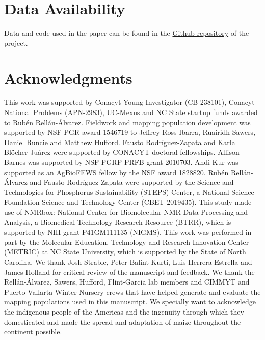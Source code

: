 \documentclass[9pt,twocolumn,twoside,lineno]{biorxiv}
\newcommand{\beginsupplement}{%
        \setcounter{table}{0}
        \renewcommand{\thetable}{S\arabic{table}}%
        \setcounter{figure}{0}
        \renewcommand{\thefigure}{S\arabic{figure}}%
     }
\begin{document}
\section{Data Availability}
Data and code used in the paper can be found in the \href{https://github.com/sawers-rellan-labs/High-PC1-paper}{Github repository} of the project. 



\section{Acknowledgments}
This work was supported by Conacyt Young Investigator (CB-238101), Conacyt National Problems (APN-2983), UC-Mexus and NC State startup funds awarded to Rub\'en Rellán-Álvarez. 
Fieldwork and mapping population development was supported by NSF-PGR award 1546719 to Jeffrey Ross-Ibarra, Ruairidh Sawers, Daniel Runcie and Matthew Hufford.  
Fausto Rodríguez-Zapata and Karla Blöcher-Juárez were supported by CONACYT doctoral fellowships.
Allison Barnes was supported by NSF-PGRP PRFB grant 2010703. 
Andi Kur was supported as an AgBioFEWS fellow by the NSF award 1828820.
Rubén Rellán-Álvarez and Fausto Rodríguez-Zapata were supported by the Science and Technologies for Phosphorus Sustainability (STEPS) Center, a National Science Foundation Science and Technology Center (CBET-2019435).
This study made use of NMRbox: National Center for Biomolecular NMR Data Processing and Analysis, a Biomedical Technology Research Resource (BTRR), which is supported by NIH grant P41GM111135 (NIGMS).
This work was performed in part by the Molecular Education, Technology and Research Innovation Center (METRIC) at NC State University, which is supported by the State of North Carolina.
We thank Josh Strable, Peter Balint-Kurti, Luis Herrera-Estrella and James Holland for critical review of the manuscript and feedback. 
We thank the Rellán-Álvarez, Sawers, Hufford, Flint-Garcia lab members and CIMMYT and Puerto Vallarta Winter Nursery crews that have helped generate and evaluate the mapping populations used in this manuscript.
We specially want to acknowledge the indigenous people of the Americas and the  ingenuity through which they domesticated and made the spread and adaptation of maize throughout the continent possible. 
\label{sec:acknowledgments}

\typeout{}


\clearpage
\beginsupplement

\onecolumn
\end{document}
